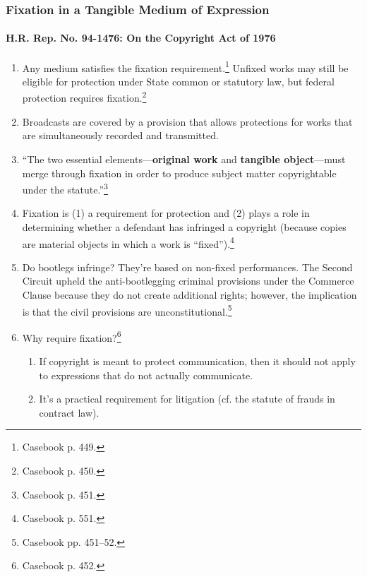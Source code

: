 \subsubsection{Fixation in a Tangible Medium of Expression}

\paragraph{H.R. Rep. No. 94-1476: On the Copyright Act of 1976}

\begin{enumerate}
    \item Any medium satisfies the fixation requirement.\footnote{Casebook p. 
    449.} Unfixed works may still be eligible for protection under State 
    common or statutory law, but federal protection requires 
    fixation.\footnote{Casebook p. 450.}
    \item Broadcasts are covered by a provision that allows protections for 
    works that are simultaneously recorded and transmitted.
    \item ``The two essential elements---\textbf{original work} and 
    \textbf{tangible object}---must merge through fixation in order to produce 
    subject matter copyrightable under the statute.''\footnote{Casebook p. 
    451.}
    \item Fixation is (1) a requirement for protection and (2) plays a role in 
    determining whether a defendant has infringed a copyright (because copies 
    are material objects in which a work is ``fixed'').\footnote{Casebook p. 
    551.}
    \item Do bootlegs infringe? They're based on non-fixed performances. The 
    Second Circuit upheld the anti-bootlegging criminal provisions under the 
    Commerce Clause because they do not create additional rights; however, the 
    implication is that the civil provisions are 
    unconstitutional.\footnote{Casebook pp. 451--52.}
    \item Why require fixation?\footnote{Casebook p. 452.}
    \begin{enumerate}
        \item If copyright is meant to protect communication, then it should 
        not apply to expressions that do not actually communicate.
        \item It's a practical requirement for litigation (cf. the statute of 
        frauds in contract law).
    \end{enumerate}
\end{enumerate}

